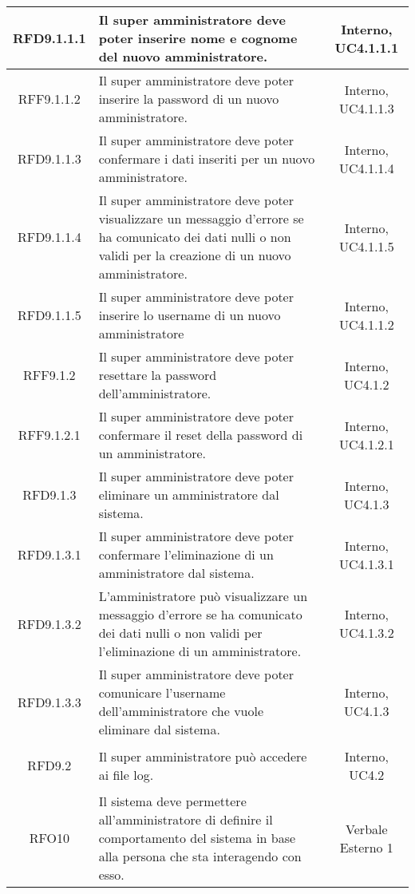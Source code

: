 \begin{longtable}{|c|>{\centering}m{7cm}|c|}
\hypertarget{RFD9.1.1.1}{RFD9.1.1.1} & Il super amministratore deve poter inserire nome e cognome del nuovo amministratore. & Interno, UC4.1.1.1\\ \hline
\hypertarget{RFF9.1.1.2}{RFF9.1.1.2} & Il super amministratore deve poter inserire la password di un nuovo amministratore. & Interno, UC4.1.1.3\\ \hline
\hypertarget{RFD9.1.1.3}{RFD9.1.1.3} & Il super amministratore deve poter confermare i dati inseriti per un nuovo amministratore. & Interno, UC4.1.1.4\\ \hline
\hypertarget{RFD9.1.1.4}{RFD9.1.1.4} & Il super amministratore deve poter visualizzare un messaggio d'errore se ha comunicato dei dati nulli o non validi per la creazione di un nuovo amministratore. & Interno, UC4.1.1.5\\ \hline
\hypertarget{RFD9.1.1.5}{RFD9.1.1.5} & Il super amministratore deve poter inserire lo username di un nuovo amministratore & Interno, UC4.1.1.2\\ \hline
\hypertarget{RFF9.1.2}{RFF9.1.2} & Il super amministratore deve poter resettare la password dell'amministratore. & Interno, UC4.1.2\\ \hline
\hypertarget{RFF9.1.2.1}{RFF9.1.2.1} & Il super amministratore deve poter confermare il reset della password di un amministratore. & Interno, UC4.1.2.1\\ \hline
\hypertarget{RFD9.1.3}{RFD9.1.3} & Il super amministratore deve poter eliminare un amministratore dal sistema. & Interno, UC4.1.3\\ \hline
\hypertarget{RFD9.1.3.1}{RFD9.1.3.1} & Il super amministratore deve poter confermare l'eliminazione di un amministratore dal sistema. & Interno, UC4.1.3.1\\ \hline
\hypertarget{RFD9.1.3.2}{RFD9.1.3.2} & L'amministratore può visualizzare un messaggio d'errore se ha comunicato dei dati nulli o non validi per l'eliminazione di un amministratore. & Interno, UC4.1.3.2\\ \hline
\hypertarget{RFD9.1.3.3}{RFD9.1.3.3} & Il super amministratore deve poter comunicare l'username dell'amministratore che vuole eliminare dal sistema. & Interno, UC4.1.3\\ \hline
\hypertarget{RFD9.2}{RFD9.2} & Il super amministratore può accedere ai file log. & Interno, UC4.2\\ \hline
\hypertarget{RFO10}{RFO10} & Il sistema deve permettere all'amministratore di definire il comportamento del sistema in base alla persona che sta interagendo con esso. & Verbale Esterno 1\\ \hline

\end{longtable}
